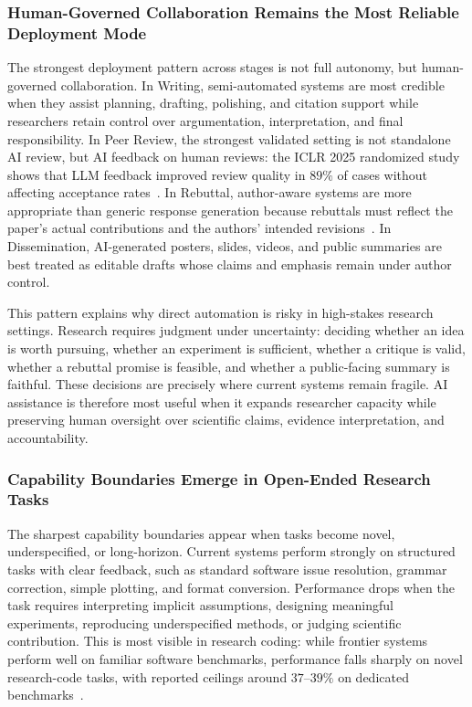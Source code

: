 \documentclass{llmxive}
\begin{document}
\subsubsection{Human-Governed Collaboration Remains the Most Reliable Deployment Mode}
\label{sec:insight_collaboration}

The strongest deployment pattern across stages is not full autonomy, but human-governed collaboration. In Writing, semi-automated systems are most credible when they assist planning, drafting, polishing, and citation support while researchers retain control over argumentation, interpretation, and final responsibility. In Peer Review, the strongest validated setting is not standalone AI review, but AI feedback on human reviews: the ICLR 2025 randomized study shows that LLM feedback improved review quality in $89\%$ of cases without affecting acceptance rates~\cite{iclr2025reviewstudy}. In Rebuttal, author-aware systems are more appropriate than generic response generation because rebuttals must reflect the paper's actual contributions and the authors' intended revisions~\cite{ruan2026authorinloop}. In Dissemination, AI-generated posters, slides, videos, and public summaries are best treated as editable drafts whose claims and emphasis remain under author control.

This pattern explains why direct automation is risky in high-stakes research settings. Research requires judgment under uncertainty: deciding whether an idea is worth pursuing, whether an experiment is sufficient, whether a critique is valid, whether a rebuttal promise is feasible, and whether a public-facing summary is faithful. These decisions are precisely where current systems remain fragile. AI assistance is therefore most useful when it expands researcher capacity while preserving human oversight over scientific claims, evidence interpretation, and accountability.


\subsubsection{Capability Boundaries Emerge in Open-Ended Research Tasks}
\label{sec:insight_open_ended}

The sharpest capability boundaries appear when tasks become novel, underspecified, or long-horizon. Current systems perform strongly on structured tasks with clear feedback, such as standard software issue resolution, grammar correction, simple plotting, and format conversion. Performance drops when the task requires interpreting implicit assumptions, designing meaningful experiments, reproducing underspecified methods, or judging scientific contribution. This is most visible in research coding: while frontier systems perform well on familiar software benchmarks, performance falls sharply on novel research-code tasks, with reported ceilings around $37$--$39\%$ on dedicated benchmarks~\cite{researchcodebench2025,scireplicatebench2025}.
\end{document}
